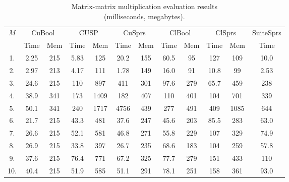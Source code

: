 {\setlength{\tabcolsep}{0.25em}
\begin{table}[t]
\centering
{
\caption{Matrix-matrix multiplication evaluation results\\(milliseconds, megabytes).}
\label{table:eval_mm_results}
\scriptsize
{}
\begin{tabular}{| c | c c | c c | c c | c c | c c | c |}
\hline
\multirow{2}{*}{$M$} & \multicolumn{2}{|c|}{CuBool} & \multicolumn{2}{|c|}{CUSP} & \multicolumn{2}{|c|}{CuSprs} & \multicolumn{2}{|c|}{ClBool} & \multicolumn{2}{|c|}{ClSprs} & \multicolumn{1}{|c|}{SuiteSprs} \\   
\cline{2-12} & Time & Mem & Time & Mem  & Time & Mem & Time & Mem & Time & Mem  & Time \\
\hline
\hline
1.           & 2.25 & 215 & 5.83 & 125  & 20.2 & 155 & 60.5 & 95  & 127  & 109  & 10.0 \\ %
2.           & 2.97 & 213 & 4.17 & 111  & 1.78 & 149 & 16.0 & 91  & 10.8 & 99   & 2.53 \\ %
3.           & 24.6 & 215 & 110  & 897  & 411  & 301 & 97.6 & 279 & 65.7 & 459  & 238  \\ %
4.           & 38.9 & 341 & 173  & 1409 & 182  & 407 & 110  & 401 & 104  & 701  & 339  \\ %
5.           & 50.1 & 341 & 240  & 1717 & 4756 & 439 & 277  & 491 & 409  & 1085 & 644  \\ %
6.           & 21.7 & 215 & 43.3 & 481  & 37.6 & 247 & 45.6 & 203 & 85.5 & 283  & 63.0 \\ %
7.           & 26.6 & 215 & 52.1 & 581  & 46.8 & 271 & 55.8 & 229 & 107  & 329  & 74.9 \\ %
8.           & 26.9 & 215 & 33.8 & 397  & 26.7 & 235 & 68.6 & 183 & 104  & 259  & 57.8 \\ %
9.           & 37.6 & 215 & 76.4 & 771  & 67.2 & 325 & 77.7 & 279 & 151  & 433  & 110  \\ %
10.          & 40.4 & 215 & 51.9 & 585  & 51.1 & 291 & 78.1 & 251 & 158  & 361  & 93.0 \\ %
\hline
\end{tabular}
}
\end{table}
}

